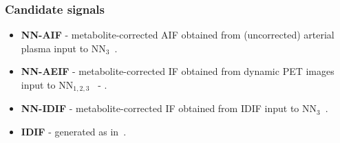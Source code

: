         \subsubsection{Candidate signals} \label{sec:candidates}
            \begin{itemize}
                \item \textbf{\gls{NN}-\gls{AIF}} - metabolite-corrected \gls{AIF} obtained from (uncorrected) arterial plasma input to \gls{NN}$_3$~.
                \item \textbf{\gls{NN}-\gls{AE}\gls{IF}} - metabolite-corrected \gls{IF} obtained from dynamic \gls{PET} images input to \gls{NN}$_{1,2,3}$~ - .
                \item \textbf{\gls{NN}-\gls{IDIF}} - metabolite-corrected \gls{IF} obtained from \gls{IDIF} input to \gls{NN}$_3$~.
                \item  \textbf{\gls{IDIF}} - generated as in~.
            \end{itemize}
